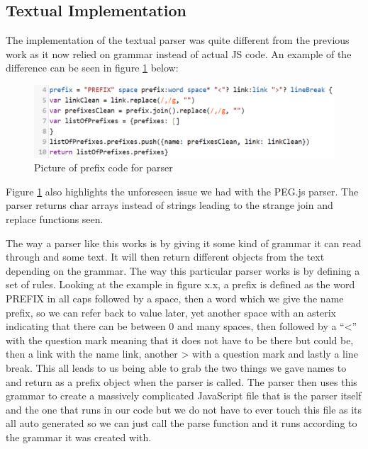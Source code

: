 \subsection{Textual Implementation}
The implementation of the textual parser was quite different from the previous work as it now relied on grammar instead of actual JS code. An example of the difference can be seen in figure \ref{fig:pegjs} below:
\begin{figure}[H]
    \centering
    \includegraphics[width=1\textwidth]{figures/pegjs.pdf}
    \caption{Picture of prefix code for parser}
    \label{fig:pegjs}
\end{figure}
Figure \ref{fig:pegjs} also highlights the unforeseen issue we had with the PEG.js parser. The parser returns char arrays instead of strings leading to the strange join and replace functions seen.

\bigskip
The way a parser like this works is by giving it some kind of grammar it can read through and some text. It will then return different objects from the text depending on the grammar. The way this particular parser works is by defining a set of rules. Looking at the example in figure x.x, a prefix is defined as the word PREFIX in all caps followed by a space, then a word which we give the name prefix, so we can refer back to value later, yet another space with an asterix indicating that there can be between 0 and many spaces, then followed by a “<” with the question mark meaning that it does not have to be there but could be, then a link with the name link, another > with a question mark and lastly a line break. This all leads to us being able to grab the two things we gave names to and return as a prefix object when the parser is called. The parser then uses this grammar to create a massively complicated JavaScript file that is the parser itself and the one that runs in our code but we do not have to ever touch this file as its all auto generated so we can just call the parse function and it runs according to the grammar it was created with.

